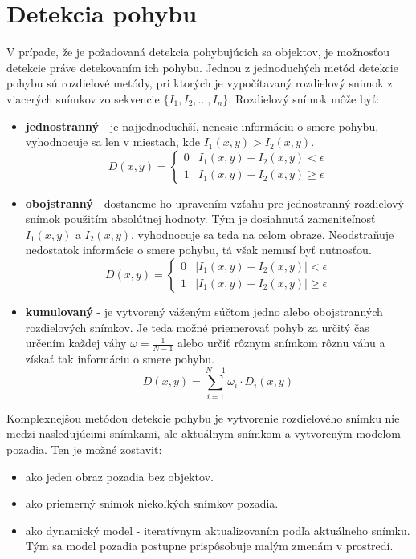 \section{Detekcia pohybu}

    V prípade, že je požadovaná detekcia pohybujúcich sa objektov, je možnosťou detekcie práve detekovaním ich pohybu. Jednou z jednoduchých metód detekcie pohybu sú rozdielové metódy, pri ktorých je vypočítavaný rozdielový snimok z viacerých snímkov zo sekvencie \(\{I_1, I_2, ..., I_n\}\). Rozdielový snímok môže byť:

    \begin{itemize}
        \item \textbf{jednostranný} - je najjednoduchší, nenesie informáciu o smere pohybu, vyhodnocuje sa len v miestach, kde \(I_1(x,y) > I_2(x,y)\).
        \[D(x,y) = \begin{cases}
            0 & I_1(x,y) - I_2(x,y) < \epsilon \\
            1 & I_1(x,y) - I_2(x,y) \geq \epsilon
        \end{cases}\]

        \item \textbf{obojstranný} - dostaneme ho upravením vzťahu pre jednostranný rozdielový snímok  použitím absolútnej hodnoty. Tým je dosiahnutá zameniteľnosť \(I_1(x,y)\) a \(I_2(x,y)\), vyhodnocuje sa teda na celom obraze. Neodstraňuje nedostatok informácie o smere pohybu, tá však nemusí byť nutnosťou.
        \[D(x,y) = \begin{cases}
            0 & |I_1(x,y) - I_2(x,y)| < \epsilon \\
            1 & |I_1(x,y) - I_2(x,y)| \geq \epsilon
        \end{cases}\]

        \item \textbf{kumulovaný} - je vytvorený váženým súčtom jedno alebo obojstranných rozdielových snímkov. Je teda možné priemerovať pohyb za určitý čas určením každej váhy \(\omega = \frac{1}{N-1}\) alebo určiť rôznym snímkom rôznu váhu a získať tak informáciu o smere pohybu.
        \[D(x,y) = \sum_{i=1}^{N-1}\omega_i \cdot D_i(x,y)\]
    \end{itemize}

    Komplexnejšou metódou detekcie pohybu je vytvorenie rozdielového snímku nie medzi nasledujúcimi snímkami, ale aktuálnym snímkom a vytvoreným modelom pozadia. Ten je možné zostaviť:

    \begin{itemize}
        \item ako jeden obraz pozadia bez objektov.
        \item ako priemerný snímok niekoľkých snímkov pozadia.
        \item ako dynamický model - iteratívnym aktualizovaním podľa aktuálneho snímku. Tým sa model pozadia postupne prispôsobuje malým zmenám v prostredí.
    \end{itemize}

